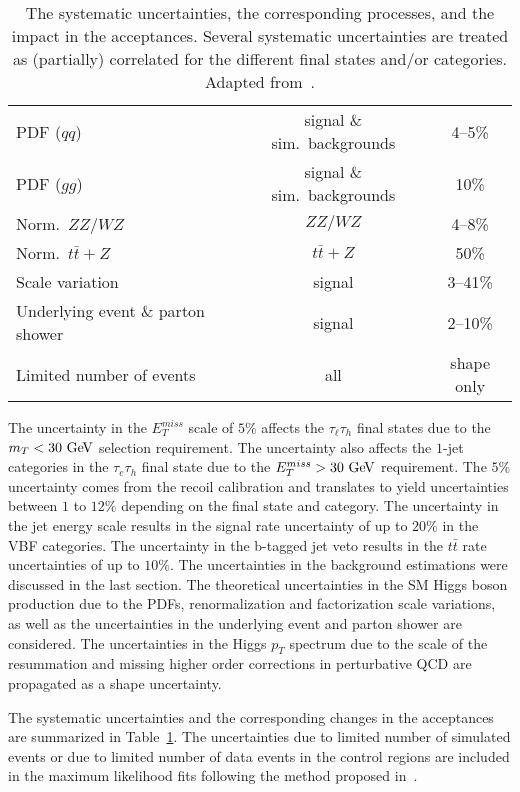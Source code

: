 \begin{table}[!ht]
\begin{center}
{\begin{tabular}{lcc}
\hline
 PDF ($qq$)                          & signal \& sim.\ backgrounds  & 4--5\% \\
 PDF ($gg$)                          & signal \& sim.\ backgrounds  & 10\% \\
 Norm.\ $ZZ/WZ$            & $ZZ/WZ$ & 4--8\% \\
 Norm.\ $t\bar{t} + Z$            & $t\bar{t} + Z$ & 50\% \\
 Scale variation                         & signal                       & 3--41\% \\
 Underlying event \& parton shower      & signal                       & 2--10\% \\
\hline
 Limited number of events                & all                 & shape only \\
 \hline
\end{tabular}
}
\caption{The systematic uncertainties, the corresponding processes, and the impact in the acceptances. Several systematic uncertainties are treated as (partially) correlated for the different final states and/or categories. Adapted from~\cite{Chatrchyan:2014nva}.
}
\label{tab:uncertainties}
\end{center}
\end{table} 
The uncertainty in the  $E_{T}^{miss}$ scale of $5\%$ affects the $\tau_{\ell}\tau_h$ final states due to the $m_{T}<30~\mathrm{Ge\kern -0.1em V}$ selection requirement. The uncertainty also affects the $1$-jet categories in the $\tau_e\tau_h$ final state due to the $E_{T}^{miss}>30~\mathrm{Ge\kern -0.1em V}$ requirement.  The $5\%$ uncertainty comes from the recoil calibration and translates to yield uncertainties between $1$ to $12\%$ depending on the final state and category. The uncertainty in the jet energy scale results in the signal rate uncertainty of up to $20\%$ in the VBF categories. The uncertainty in the b-tagged jet veto results in the $t\bar{t}$ rate uncertainties of up to $10\%$. The uncertainties in the background estimations were discussed in the last section. The theoretical uncertainties in the SM Higgs boson production due to the PDFs, renormalization and factorization scale variations, as well as the uncertainties in the underlying event and parton shower are considered. The uncertainties in the Higgs $p_T$ spectrum due to the scale of the resummation and missing higher order corrections in perturbative QCD are propagated as a shape uncertainty.    

The systematic uncertainties and the corresponding changes in the acceptances are summarized in Table~\ref{tab:uncertainties}. The uncertainties due to limited number of simulated events or due to limited number of data events in the control regions are included in the maximum likelihood fits following the method proposed in~\cite{Barlow:1993dm}.   

